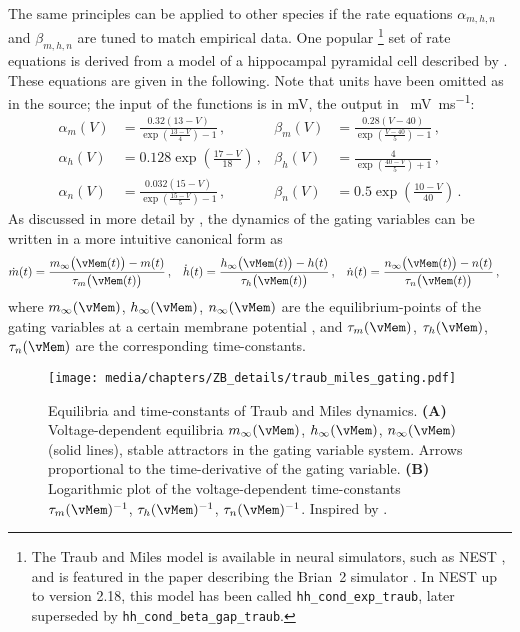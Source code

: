 The same principles can be applied to other species if the rate equations $\alpha_{m, h, n}$ and $\beta_{m, h, n}$ are tuned to match empirical data.
One popular%
\footnote{The Traub and Miles model is available in neural simulators, such as NEST \citep{gewaltig2007nest}, and is featured in the paper describing the Brian~2 simulator \citep{stimberg2019brian}. In NEST up to version 2.18, this model has been called \texttt{hh\_cond\_exp\_traub}, later superseded by \texttt{hh\_cond\_beta\_gap\_traub}.}
set of rate equations is derived from a model of a hippocampal pyramidal cell described by \citet[Chapter 4, p.~92-94]{traub1991neuronal}.
These equations are given in the following.
Note that units have been omitted as in the source; the input of the functions is in \si{\milli\volt}, the output in \si{\per\milli\volt\per\milli\second}:
\begin{align*}
	\alpha_m(V) &= \frac{0.32(13 - V)}{\exp\left(\frac{13 - V}{4}\right) - 1} \,, &
	\beta_m(V) &= \frac{0.28(V - 40)}{\exp\left(\frac{V - 40}{5}\right) - 1} \,, \\
	\alpha_h(V) &= 0.128 \exp\left( \frac{17 - V}{18}\right) \,, &
	\beta_h(V) &= \frac{4}{ \exp\left( \frac{40 - V}{5}\right) + 1 } \,, \\
	\alpha_n(V) &= \frac{0.032(15 - V)}{\exp\left(\frac{15 - V}{5}\right) - 1} \,, &
	\beta_n(V) &= 0.5 \exp\left(\frac{10 - V}{40}\right) \,.
\end{align*}
As discussed in more detail by \citet[Chapter~2.3]{izhikevich2007dynamical}, the dynamics of the gating variables can be written in a more intuitive canonical form as
\begin{align*}
	\dot m(t) &= \frac{m_\infty\bigl(\vMem(t)\bigr) - m(t)}{\tau_m\bigl(\vMem(t)\bigr)} \,, &
	\dot h(t) &= \frac{h_\infty\bigl(\vMem(t)\bigr) - h(t)}{\tau_h\bigl(\vMem(t)\bigr)} \,, &
	\dot n(t) &= \frac{n_\infty\bigl(\vMem(t)\bigr) - n(t)}{\tau_n\bigl(\vMem(t)\bigr)} \,,
\end{align*}
where $m_\infty(\vMem)$, $h_\infty(\vMem)$, $n_\infty(\vMem)$ are the equilibrium-points of the gating variables at a certain membrane potential \vMem, and $\tau_m(\vMem)$, $\tau_h(\vMem)$, $\tau_n(\vMem)$ are the corresponding time-constants.

\begin{figure}[t]
	\centering
	\texttt{[image: media/chapters/ZB\_details/traub\_miles\_gating.pdf]}%
	{\label{fig:traub_miles_gating_equilibrium}}%
	{\label{fig:traub_miles_gating_time_constants}}%
	\caption[Equilibria and time-constants of the Traub and Miles dynamics]{Equilibria and time-constants of Traub and Miles dynamics. \textbf{(A)} Voltage-dependent equilibria $m_\infty(\vMem)$, $h_\infty(\vMem)$, $n_\infty(\vMem)$ (solid lines), stable attractors in the gating variable system.
	Arrows proportional to the time-derivative of the gating variable. \textbf{(B)} Logarithmic plot of the voltage-dependent time-constants $\tau_m(\vMem)^{-1}$, $\tau_h(\vMem)^{-1}$, $\tau_n(\vMem)^{-1}$. Inspired by \citet[Figure~2.13, p.~39]{izhikevich2007dynamical}.	}
	\label{fig:traub_miles}
\end{figure} 

